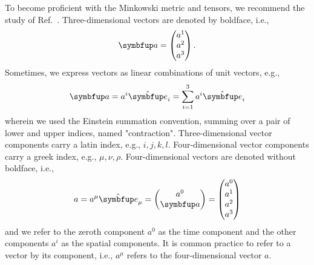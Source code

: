 To become proficient with the Minkowski metric and tensors, we recommend the study of Ref.~\cite{Carroll1997}.
Three-dimensional vectors are denoted by boldface, i.e.,
\begin{equation*}
	\vb{a}
	=
	\begin{pmatrix}
		a^1 \\
		a^2 \\
		a^3
	\end{pmatrix}
	.
\end{equation*}
Sometimes, we express vectors as linear combinations of unit vectors, e.g.,
\begin{equation*}
	\vb{a}
	=
	a^i
	\vu{e}_i
	=
	\sum_{i=1}^3
	a^i
	\vu{e}_i
\end{equation*}
wherein we used the Einstein summation convention, summing over a pair of lower and upper indices, named "contraction".
Three-dimensional vector components carry a latin index, e.g., $i,j,k,l$.
Four-dimensional vector components carry a greek index, e.g., $\mu,\nu,\rho$.
Four-dimensional vectors are denoted without boldface, i.e.,
\begin{equation*}
	a
	=
	a^\mu
	\vu{e}_\mu
	=
	\begin{pmatrix}
		a^0 \\
		\vb{a}
	\end{pmatrix}
	=
	\begin{pmatrix}
		a^0 \\
		a^1 \\
		a^2 \\
		a^3
	\end{pmatrix}
\end{equation*}
and we refer to the zeroth component $a^0$ as the time component and the other components $a^i$ as the spatial components.
It is common practice to refer to a vector by its component, i.e., $a^\mu$ refers to the four-dimensional vector $a$.

